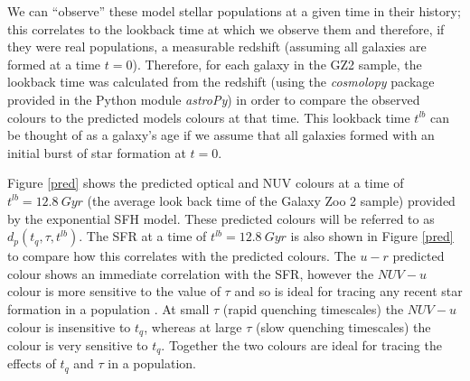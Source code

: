 \documentclass{mn2e}
\begin{document}
We can ``observe'' these model stellar populations at a given time in their history; this correlates to the lookback time at which we observe them and therefore, if they were real populations, a measurable redshift (assuming all galaxies are formed at a time $t=0$). Therefore, for each galaxy in the GZ2 sample, the lookback time was calculated from the redshift (using the \emph{cosmolopy} package provided in the Python module \emph{astroPy}) in order to compare the observed colours to the predicted models colours at that time. This lookback time $t^{lb}$ can be thought of as a galaxy's age if we assume that all galaxies formed with an initial burst of star formation at $t=0$. 

Figure \ref{pred} shows the predicted optical and NUV colours at a time of $t^{lb} = 12.8 ~Gyr$ (the average look back time of the Galaxy Zoo 2 sample) provided by the exponential SFH model. These predicted colours will be referred to as $d_{p}(t_{q}, \tau, t^{lb})$. The SFR at a time of $t^{lb}=12.8~Gyr$ is also shown in Figure \ref{pred} to compare how this correlates with the predicted colours. The $u-r$ predicted colour shows an immediate correlation with the SFR, however the $NUV-u$ colour is more sensitive to the value of $\tau$ and so is ideal for tracing any recent star formation in a population . At small $\tau$ (rapid quenching timescales) the $NUV-u$ colour is insensitive to $t_{q}$, whereas at large $\tau$ (slow quenching timescales) the colour is very sensitive to $t_{q}$. Together the two colours are ideal for tracing the effects of $t_{q}$ and $\tau$ in a population. 
\end{document}
